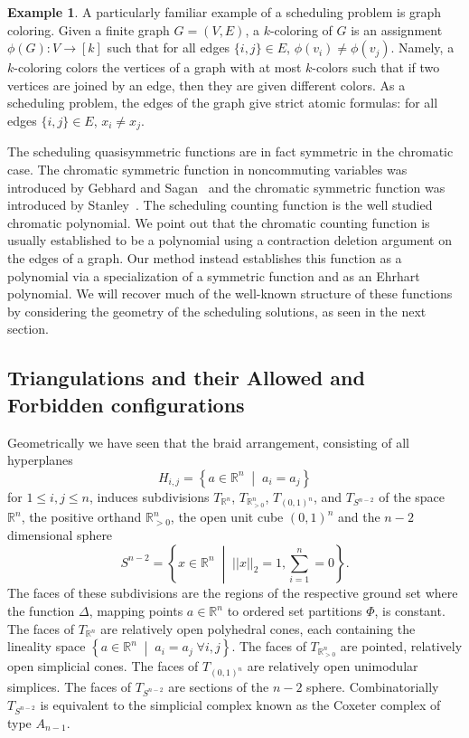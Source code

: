 \documentclass[12pt,reqno]{amsart}
\numberwithin{definition}{section}
\theoremstyle{definition}
\newtheorem{example}[definition]{Example}
\newcommand{\RR}{\mathbb{R}}
\newcommand{\SSS}{\mathcal{S}}
\newcommand{\mset}[2]{ \left\{ #1 \; \middle| \; #2 \right\}}
\newcommand{\T}{T} %
\newcommand{\TRn}{\T_{\RR^n}} %
\newcommand{\TS}{\T_{S^{n-2}}} %
\newcommand{\TP}{\T_{\RR^n_{> 0}}} %
\newcommand{\TC}{\T_{(0,1)^n}} %
\newcommand{\poly}{\chi} %
\begin{document}
\begin{example}
A particularly familiar example of a scheduling problem is graph
coloring.  Given a finite graph $G = (V,E)$, a $k$-coloring of $G$ is
an assignment $\phi(G): V \rightarrow [k]$ such that for all edges
$\{i,j\} \in E$, $\phi(v_i) \neq \phi(v_j)$.  Namely, a
$k$-coloring colors the vertices of a graph with at most $k$-colors
such that if two vertices are joined by an edge, then they are given
different colors.  As a scheduling problem, the edges of the graph
give strict atomic formulas: for all edges $\{i,j\} \in E$, $x_i
\neq x_j$.  

The scheduling quasisymmetric functions are in fact symmetric in the
chromatic case.  The chromatic symmetric function in noncommuting
variables was introduced by Gebhard and Sagan~\cite{GS} and the
chromatic symmetric function was introduced by
Stanley~\cite{stan-chromatic}.  The scheduling counting function is
the well studied chromatic polynomial.  We point out that the
chromatic counting function is usually established to be a polynomial
using a contraction deletion argument on the edges of a graph.  Our
method instead establishes this function as a polynomial via a
specialization of a symmetric function and as an Ehrhart polynomial.  We will recover much of the well-known structure of these functions by considering the geometry of the scheduling solutions, as seen in the next section.

\end{example}


\subsection{Triangulations and their Allowed and Forbidden configurations}
Geometrically we have seen that
the braid arrangement, consisting of all hyperplanes
\[
  H_{i,j} = \mset{a\in\RR^n}{a_i = a_j}
\]
for $1\leq i,j\leq n$, induces subdivisions $\TRn$, $\TP$, $\TC$, and $\TS$ of the space $\RR^n$, the positive orthand $\RR^n_{> 0}$, the open unit cube $(0,1)^n$ and the $n-2$ dimensional sphere
\[
S^{n-2}=\mset{x\in\RR^n}{||x||_2 = 1, \sum_{i=1}^n = 0}.
\]
 The faces of these subdivisions are the regions of the respective ground set where the function $\Delta$, mapping points $a\in\RR^n$ to ordered set partitions $\Phi$, is constant. The faces of $\TRn$ are relatively open polyhedral cones, each containing the lineality space $\mset{a\in\RR^n}{a_i=a_j \; \forall i,j}$. The faces of $\TP$ are pointed, relatively open simplicial cones. The faces of $\TC$ are relatively open unimodular simplices. The faces of $\TS$ are sections of the $n-2$ sphere. Combinatorially $\TS$ is equivalent to the simplicial complex known as the Coxeter complex of type $A_{n-1}$.
\end{document}
